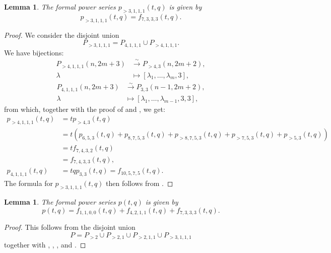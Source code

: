 \documentclass[a4paper, 12pt, reqno]{amsart}
\newtheorem{lemma}[theorem]{Lemma}
\theoremstyle{remark}
\begin{document}
\begin{lemma}
  \label{lmm:43}
  The formal power series $p_{>3, 1, 1, 1}(t, q)$ is given by
  \begin{equation*}
    p_{>3, 1, 1, 1}(t, q) = f_{7, 3, 3, 3}(t, q).
  \end{equation*}
\end{lemma}

\begin{proof}
  We consider the disjoint union
  \begin{equation*}
    P_{>3, 1, 1, 1} = P_{4, 1, 1, 1} \cup P_{>4, 1, 1, 1}.
  \end{equation*}
  We have bijections:
  \begin{align*}
    P_{>4, 1, 1, 1}(n, 2m + 3) &\xrightarrow{\sim} P_{>4, 3}(n, 2m + 2), \\
    \lambda &\mapsto [\lambda_1, \dots, \lambda_m, 3],
  \end{align*}
  \begin{align*}
    P_{4, 1, 1, 1}(n, 2m + 3) &\xrightarrow{\sim} P_{3, 3}(n - 1, 2m + 2), \\
    \lambda &\mapsto [\lambda_1, \dots, \lambda_{m - 1}, 3, 3],
  \end{align*}
  from which, together with the proof of  and , we get:
  \begin{align*}
    p_{>4, 1, 1, 1}(t, q) &= tp_{>4, 3}(t, q) \\
                          &= t(p_{6, 5, 3}(t, q) + p_{8, 7, 5, 3}(t, q) + p_{>8, 7, 5, 3}(t, q) + p_{>7, 5, 3}(t, q) + p_{>5, 3}(t, q)) \\
                          &= tf_{7, 4, 3, 2}(t, q) \\
                          &= f_{7, 4, 3, 3}(t, q), \\
    p_{4, 1, 1, 1}(t, q) &= tqp_{3, 3}(t, q) = f_{10, 5, 7, 5}(t, q).
  \end{align*}
  The formula for $p_{>3, 1, 1, 1}(t, q)$ then follows from .
\end{proof}

\begin{lemma}
  \label{lmm:44}
  The formal power series $p(t, q)$ is given by
  \begin{equation*}
    p(t, q) = f_{1, 1, 0, 0}(t, q) + f_{4, 2, 1, 1}(t, q) + f_{7, 3, 3, 3}(t, q).
  \end{equation*}
\end{lemma}

\begin{proof}
  This follows from the disjoint union
  \begin{equation*}
    P = P_{>2} \cup P_{>2, 1} \cup P_{>2, 1, 1} \cup P_{>3, 1, 1, 1}
  \end{equation*}
  together with , , ,  and .
\end{proof}
\end{document}
